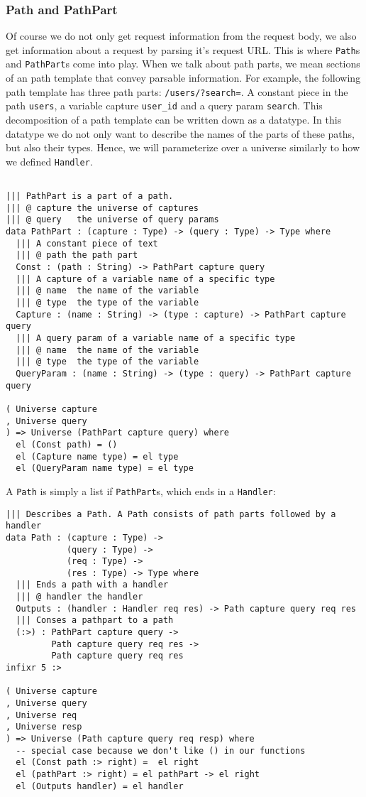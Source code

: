 \documentclass[12pt,a4paper]{article}
\begin{document}
\subsubsection{Path and PathPart}
Of course we do not only get request information from the request body,
we also get information about a request by parsing it's request URL. This
is where \texttt{Path}s and \texttt{PathPart}s come into play. 
When we talk about path parts, we mean sections of an path template that convey parsable information.
For example, the following path template has three path parts: \texttt{/users/?search=}. A constant piece
in the path \texttt{users}, a variable capture \texttt{user\_id} and a query param \texttt{search}. This
decomposition of a path template can be written down as a datatype. In this datatype we do not only
want to describe the names of the parts of these paths, but also their types. Hence, we will parameterize
over a universe similarly to how we defined \texttt{Handler}.
\begin{verbatim}

||| PathPart is a part of a path.
||| @ capture the universe of captures
||| @ query   the universe of query params
data PathPart : (capture : Type) -> (query : Type) -> Type where
  ||| A constant piece of text
  ||| @ path the path part
  Const : (path : String) -> PathPart capture query
  ||| A capture of a variable name of a specific type
  ||| @ name  the name of the variable
  ||| @ type  the type of the variable
  Capture : (name : String) -> (type : capture) -> PathPart capture query
  ||| A query param of a variable name of a specific type
  ||| @ name  the name of the variable
  ||| @ type  the type of the variable
  QueryParam : (name : String) -> (type : query) -> PathPart capture query

( Universe capture
, Universe query
) => Universe (PathPart capture query) where
  el (Const path) = ()
  el (Capture name type) = el type
  el (QueryParam name type) = el type
\end{verbatim}

A \texttt{Path} is simply a list if \texttt{PathPart}s, which ends in a \texttt{Handler}:
\begin{verbatim}
||| Describes a Path. A Path consists of path parts followed by a handler
data Path : (capture : Type) -> 
            (query : Type) ->
            (req : Type) ->
            (res : Type) -> Type where
  ||| Ends a path with a handler
  ||| @ handler the handler
  Outputs : (handler : Handler req res) -> Path capture query req res
  ||| Conses a pathpart to a path
  (:>) : PathPart capture query ->
         Path capture query req res ->
         Path capture query req res
infixr 5 :>

( Universe capture
, Universe query
, Universe req
, Universe resp
) => Universe (Path capture query req resp) where
  -- special case because we don't like () in our functions
  el (Const path :> right) =  el right
  el (pathPart :> right) = el pathPart -> el right
  el (Outputs handler) = el handler
\end{verbatim}
\end{document}
